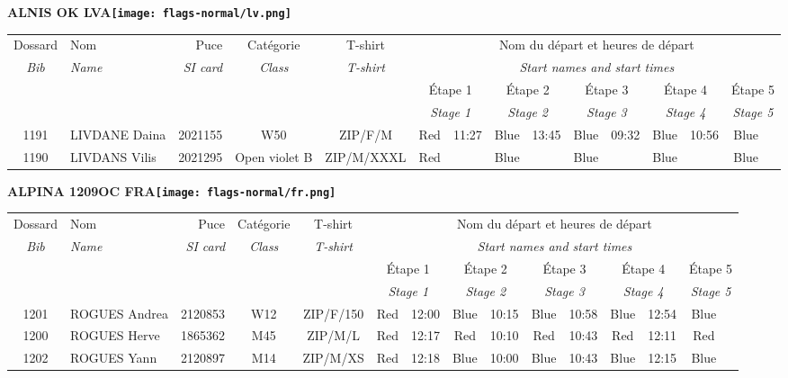 \documentclass{report}
\begin{document}
\newpage
  \Huge \centering \bfseries ALNIS OK  LVA\normalfont \footnotesize \sffamily \hfill \texttt{[image: flags-normal/lv.png]} \newline 
  \begin{longtable}{|c|l|r|c|c|*{5}{cc|}}
    Dossard & Nom  & Puce    & Catégorie & T-shirt & \multicolumn{10}{c|}{Nom du départ et heures de départ} \\
    \itshape Bib     & \itshape Name & \itshape SI card & \itshape Class  & \itshape  T-shirt  & \multicolumn{10}{c|}{\itshape Start names and start times} \\
    \hline
    & & & & & \multicolumn{2}{c|}{Étape 1} & \multicolumn{2}{c|}{Étape 2} & \multicolumn{2}{c|}{Étape 3} & \multicolumn{2}{c|}{Étape 4} & \multicolumn{2}{c|}{Étape 5} \\
    & & & & & \multicolumn{2}{c|}{\itshape Stage 1} & \multicolumn{2}{c|}{\itshape Stage 2} & \multicolumn{2}{c|}{\itshape Stage 3} & \multicolumn{2}{c|}{\itshape Stage 4} & \multicolumn{2}{c|}{\itshape Stage 5} \\
    \hline
    1191 & LIVDANE Daina & 2021155 & W50 & ZIP/F/M & Red & 11:27 & Blue & 13:45 & Blue & 09:32 & Blue & 10:56 & Blue &  \\
    1190 & LIVDANS Vilis & 2021295 & Open violet B & ZIP/M/XXXL & Red &   & Blue &   & Blue &   & Blue &   & Blue &  \\
  \end{longtable}
\newpage
  \Huge \centering \bfseries ALPINA 1209OC FRA\normalfont \footnotesize \sffamily \hfill \texttt{[image: flags-normal/fr.png]} \newline 
  \begin{longtable}{|c|l|r|c|c|*{5}{cc|}}
    Dossard & Nom  & Puce    & Catégorie & T-shirt & \multicolumn{10}{c|}{Nom du départ et heures de départ} \\
    \itshape Bib     & \itshape Name & \itshape SI card & \itshape Class  & \itshape  T-shirt  & \multicolumn{10}{c|}{\itshape Start names and start times} \\
    \hline
    & & & & & \multicolumn{2}{c|}{Étape 1} & \multicolumn{2}{c|}{Étape 2} & \multicolumn{2}{c|}{Étape 3} & \multicolumn{2}{c|}{Étape 4} & \multicolumn{2}{c|}{Étape 5} \\
    & & & & & \multicolumn{2}{c|}{\itshape Stage 1} & \multicolumn{2}{c|}{\itshape Stage 2} & \multicolumn{2}{c|}{\itshape Stage 3} & \multicolumn{2}{c|}{\itshape Stage 4} & \multicolumn{2}{c|}{\itshape Stage 5} \\
    \hline
    1201 & ROGUES Andrea & 2120853 & W12 & ZIP/F/150 & Red & 12:00 & Blue & 10:15 & Blue & 10:58 & Blue & 12:54 & Blue &  \\
    1200 & ROGUES Herve & 1865362 & M45 & ZIP/M/L & Red & 12:17 & Red & 10:10 & Red & 10:43 & Red & 12:11 & Red &  \\
    1202 & ROGUES Yann & 2120897 & M14 & ZIP/M/XS & Red & 12:18 & Blue & 10:00 & Blue & 10:43 & Blue & 12:15 & Blue &  \\
  \end{longtable}
\end{document}
